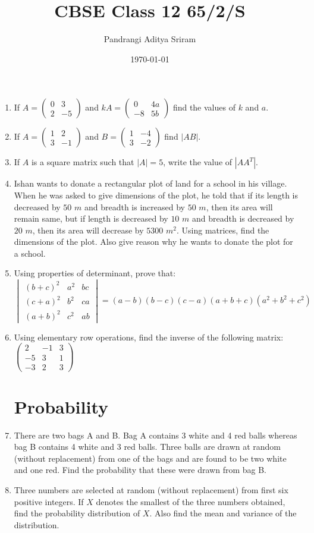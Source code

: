 \documentclass[10pt,-letter paper]{article}
\title{CBSE Class 12 65/2/S}
\date{\today}
\author{Pandrangi Aditya Sriram}
\providecommand{\abs}[1]{\left\vert#1\right\vert}
\newcommand{\myvec}[1]{\ensuremath{\begin{pmatrix}#1\end{pmatrix}}}
\newcommand{\mydet}[1]{\ensuremath{\begin{vmatrix}#1\end{vmatrix}}}
\begin{document}
\maketitle

\begin{enumerate}
\section{Matrices}
\item If $A = \myvec{0 & 3 \\ 2 & -5}$ and $kA = \myvec{0 & 4a \\ -8 & 5b}$ find the values of $k$ and $a$.
\item If $A = \myvec{1 & 2 \\ 3 & -1}$ and $B = \myvec{1 & -4 \\ 3 & -2}$ find $\abs{AB}$.
\item If $A$ is a square matrix such that $\abs{A} = 5$, write the value of $\abs{A A^T}$.
\item Ishan wants to donate a rectangular plot of land for a school in his village. When he was asked to give dimensions of the plot, he told that if its length is decreased by $50$ $m$ and breadth is increased by $50$ $m$, then its area will remain same, but if length is decreased by $10$ $m$ and breadth is decreased by $20$ $m$, then its area will decrease by $5300$ $m^2$. Using matrices, find the dimensions of the plot. Also give reason why he wants to donate the plot for a school.
\item Using properties of determinant, prove that:
$\mydet{(b+c)^2 & a^2 & bc \\ (c+a)^2 & b^2 & ca \\ (a+b)^2 & c^2 & ab} = (a-b)(b-c)(c-a)(a+b+c)(a^2 + b^2 + c^2)$ 
\item Using elementary row operations, find the inverse of the following matrix: $\myvec{2 & -1 & 3 \\ -5 & 3 & 1 \\ -3 & 2 & 3}$
\section{Probability}
\item There are two bags A and B. Bag A contains 3 white and 4 red balls whereas bag B contains 4 white and 3 red balls. Three balls are drawn at random (without replacement) from one of the bags and are found to be two white and one red. Find the probability that these were drawn from bag B.
\item Three numbers are selected at random (without replacement) from first six positive integers. If $X$ denotes the smallest of the three numbers obtained, find the probability distribution of $X$. Also find the mean and variance of the distribution.

\end{enumerate}
\end{document}
